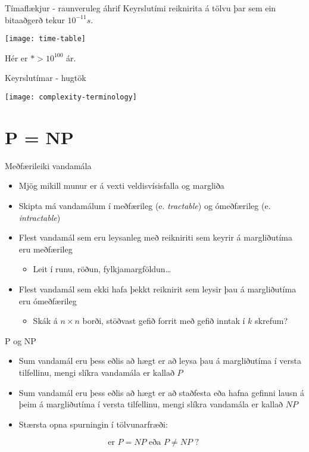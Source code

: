 \documentclass[handout]{beamer}
\begin{document}
\begin{frame}{Tímaflækjur - raunveruleg áhrif}
Keyrslutími reiknirita á tölvu þar sem ein bitaaðgerð tekur $10^{-11}s$.
\begin{center}
\texttt{[image: time-table]}
\end{center}
Hér er $* > 10^{100}$ ár.
\end{frame}

\begin{frame}{Keyrslutímar - hugtök}
\begin{center}
\texttt{[image: complexity-terminology]}
\end{center}
\end{frame}


\section{P = NP}

\begin{frame}{Meðfærileiki vandamála}
\begin{itemize}
 \item Mjög mikill munur er á vexti veldisvísisfalla og margliða
 \item Skipta má vandamálum í meðfærileg (e. \emph{tractable}) og ómeðfærileg (e. \emph{intractable})
 \item Flest vandamál sem eru leysanleg með reikniriti sem keyrir á margliðutíma eru meðfærileg
 \begin{itemize}
  \item Leit í runu, röðun, fylkjamargföldun\ldots
 \end{itemize}
 \item Flest vandamál sem ekki hafa þekkt reiknirit sem leysir þau á margliðutíma eru ómeðfærileg
 \begin{itemize}
  \item Skák á $n \times n$ borði, stöðvast gefið forrit með gefið inntak í $k$ skrefum?
 \end{itemize}
\end{itemize}
\end{frame}

\begin{frame}{P og NP}
\begin{itemize}
 \item Sum vandamál eru þess eðlis að hægt er að leysa þau á margliðutíma í versta tilfellinu, mengi slíkra vandamála er kallað $P$
 \item Sum vandamál eru þess eðlis að hægt er að staðfesta eða hafna gefinni lausn á þeim á margliðutíma í versta tilfellinu, mengi slíkra vandamála er kallað $NP$
 \item Stærsta opna spurningin í tölvunarfræði:
\end{itemize}
\[
 \text{er } P = NP \text { eða } P \neq NP \text{ ? }
\]
\end{frame}
\end{document}
